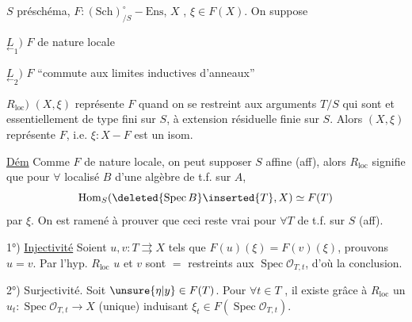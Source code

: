   $S$ préschéma, $F:(\mathrm{Sch})_{/S}^{\circ}\mathbin{-}\mathrm{Ens}$, $X$  , $\xi\in F(X)$. On suppose

$\underset{\leftarrow}{L}_1)$  $F$ de nature locale

$\underset{\leftarrow}{L}_2)$  $F$ ``commute aux limites inductives d'anneaux''

$R_{\mathrm{loc}})$  $(X,\xi)$ représente $F$ quand on se restreint aux arguments $T/S$ qui sont   et essentiellement de type fini sur $S$, à extension résiduelle finie sur $S$.
Alors $(X,\xi)$ représente $F$, i.e. $\xi:X\mathbin{-}F$ est un isom.


\uline{Dém} Comme $F$ de nature locale, on peut supposer $S$ affine (aff), alors $R_{\mathrm{loc}}$ signifie que pour $\forall$  localisé $B$ d'une algèbre de t.f. sur $A$,
\[
\operatorname{Hom}_S(\deleted{\operatorname{Spec}B}\inserted{T},X)\simeq F(T)
\]
par $\xi$.  On est ramené à prouver que ceci reste vrai pour $\forall T$ de t.f. sur $S$ (aff).

1°) \uline{Injectivité} Soient $u,v:T\rightrightarrows X$  tels que $F(u)(\xi)=F(v)(\xi)$, prouvons $u=v$. Par l'hyp. $R_{\mathrm{loc}}$ $u$ et $v$ sont $=$ restreints aux $\operatorname{Spec}\mathcal O_{T,t}$, d'où la conclusion.

2°) Surjectivité. Soit $\unsure{\eta|y}\in F(T)$. Pour $\forall t\in T$ , il existe grâce à $R_{\mathrm{loc}}$ un $u_t:\operatorname{Spec}\mathcal O_{T,t}\to X$ (unique) induisant $\xi_t\in F(\operatorname{Spec}\mathcal O_{T,t})$. 
